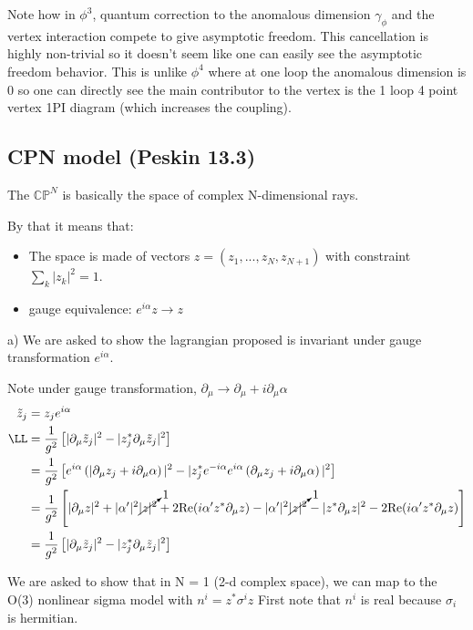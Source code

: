 \documentclass[9pt]{scrartcl}
\begin{document}
Note how in $\phi^3$, quantum correction to the anomalous dimension $\gamma_\phi$ and the vertex interaction compete to give asymptotic freedom.  This cancellation is highly non-trivial so it doesn't seem like one can easily see the asymptotic freedom behavior.  This is unlike $\phi^4$ where at one loop the anomalous dimension is 0 so one can directly see the main contributor to the vertex is the 1 loop 4 point vertex 1PI diagram (which increases the coupling).

\subsection{CPN model (Peskin 13.3)}

The  $\mathbb{C} \mathbb{P}^N$ is basically the space of complex N-dimensional rays.

By that it means that:
\begin{itemize}
	\item The space is made of vectors $z = (z_1, ..., z_N, z_{N+1})$
	with constraint $\sum_k |z_k|^2 = 1$.
	\item gauge equivalence: $e^{i \alpha} z  \rightarrow z$ 
\end{itemize}

a) We are asked to show the lagrangian proposed is invariant under gauge transformation $e^{i \alpha}$.

Note under gauge transformation, $\partial_\mu \rightarrow \partial_\mu + i \partial_\mu \alpha$
\begin{align}
	\tilde{z}_j &= z_j e^{i \alpha} \\
	\LL  &= {1 \over g^2} \left[ |\partial_\mu \tilde{z}_j|^2 - |z_j^* \partial_\mu \tilde{z}_j|^2  \right] \\
	& = {1 \over g^2} \left[ e^{i \alpha} \left(|\partial_\mu z_j + i \partial_\mu \alpha \right)|^2 - |z_j^* e^{-i \alpha} e^{i \alpha} \left(\partial_\mu z_j + i \partial_\mu \alpha   \right)|^2  \right] \\
	& = {1 \over g^2} \left[ |\partial_\mu z|^2 + |\alpha'|^2 \cancelto{1}{ |z|^2} + 2 \mathrm{Re} (i \alpha' z^* \partial_\mu z) - |\alpha'|^2 \cancelto{1}{|z|^2} - |z^* \partial_\mu z|^2 - 2 \mathrm{Re} ( i \alpha' z^* \partial_\mu z) \right]  \\
	& = {1 \over g^2} \left[ |\partial_\mu \tilde{z}_j|^2 - |z_j^* \partial_\mu \tilde{z}_j|^2  \right]
\end{align}

We are asked to show that in N = 1 (2-d complex space), we can map to the O(3) nonlinear sigma model with $n^i = z^* \sigma^i z$
First note that $n^i$ is real because $\sigma_i$ is hermitian.
\end{document}
